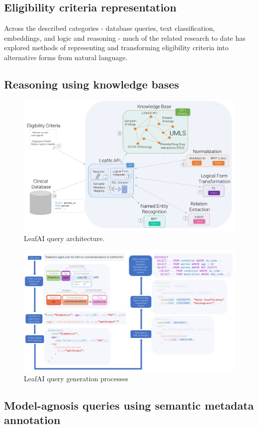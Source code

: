 \documentclass[../main.tex]{subfiles}
\begin{document}
\subsection*{Eligibility criteria representation}

\noindent Across the described categories - database queries, text classification, embeddings, and logic and reasoning - much of the related research to date has explored methods of representing and transforming eligibility criteria into alternative forms from natural language. 

\subsection*{Reasoning using knowledge bases}

\begin{figure}[h]
  \includegraphics[scale=0.6]{figures/leafai_architecture.pdf}  
\caption{LeafAI query architecture.}
\label{fig_leafai_architecture}
\end{figure}

\begin{figure}[h]
  \includegraphics[scale=0.47]{figures/leafai_flow.pdf}  
\caption{LeafAI query generation processes}
\label{fig_leafai_querygen}
\end{figure}

\subsection*{Model-agnosis queries using semantic metadata annotation}
\end{document}
